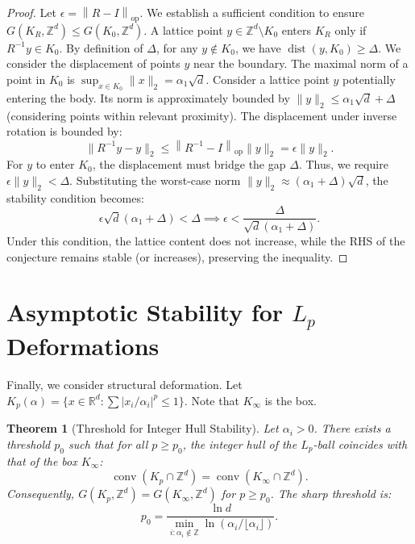 \documentclass[11pt, reqno]{amsart}
\newtheorem{theorem}{Theorem}
\theoremstyle{definition}
\newcommand{\R}{\mathbb{R}}
\newcommand{\Z}{\mathbb{Z}}
\newcommand{\opnorm}[1]{\left\| #1 \right\|_{\mathrm{op}}} %
\DeclareMathOperator{\conv}{conv}
\DeclareMathOperator{\dist}{dist}
\begin{document}
\begin{proof}
Let $\epsilon = \opnorm{R - I}$. We establish a sufficient condition to ensure $G(K_R, \Z^d) \le G(K_0, \Z^d)$.
A lattice point $y \in \Z^d \setminus K_0$ enters $K_R$ only if $R^{-1}y \in K_0$.
By definition of $\Delta$, for any $y \notin K_0$, we have $\dist(y, K_0) \ge \Delta$.
We consider the displacement of points $y$ near the boundary. The maximal norm of a point in $K_0$ is $\sup_{x \in K_0} \|x\|_2 = \alpha_1 \sqrt{d}$.
Consider a lattice point $y$ potentially entering the body. Its norm is approximately bounded by $\|y\|_2 \le \alpha_1\sqrt{d} + \Delta$ (considering points within relevant proximity).
The displacement under inverse rotation is bounded by:
\[
\|R^{-1}y - y\|_2 \le \opnorm{R^{-1}-I} \|y\|_2 = \epsilon \|y\|_2.
\]
For $y$ to enter $K_0$, the displacement must bridge the gap $\Delta$. Thus, we require $\epsilon \|y\|_2 < \Delta$.
Substituting the worst-case norm $\|y\|_2 \approx (\alpha_1 + \Delta)\sqrt{d}$, the stability condition becomes:
\[
\epsilon \sqrt{d}(\alpha_1 + \Delta) < \Delta \implies \epsilon < \frac{\Delta}{\sqrt{d}(\alpha_1 + \Delta)}.
\]
Under this condition, the lattice content does not increase, while the RHS of the conjecture remains stable (or increases), preserving the inequality.
\end{proof}


\section{Asymptotic Stability for $L_p$ Deformations}

Finally, we consider structural deformation. Let $K_p(\alpha) = \{ x \in \R^d : \sum |x_i/\alpha_i|^p \le 1 \}$. Note that $K_\infty$ is the box.

\begin{theorem}[Threshold for Integer Hull Stability]
Let $\alpha_i > 0$. There exists a threshold $p_0$ such that for all $p \ge p_0$, the integer hull of the $L_p$-ball coincides with that of the box $K_\infty$:
\begin{equation}
\conv(K_p \cap \Z^d) = \conv(K_\infty \cap \Z^d).
\end{equation}
Consequently, $G(K_p, \Z^d) = G(K_\infty, \Z^d)$ for $p \ge p_0$. The sharp threshold is:
\begin{equation}
p_0 = \frac{\ln d}{\min_{i: \alpha_i \notin \Z} \ln(\alpha_i / \lfloor \alpha_i \rfloor)}.
\end{equation}
\end{theorem}
\end{document}
